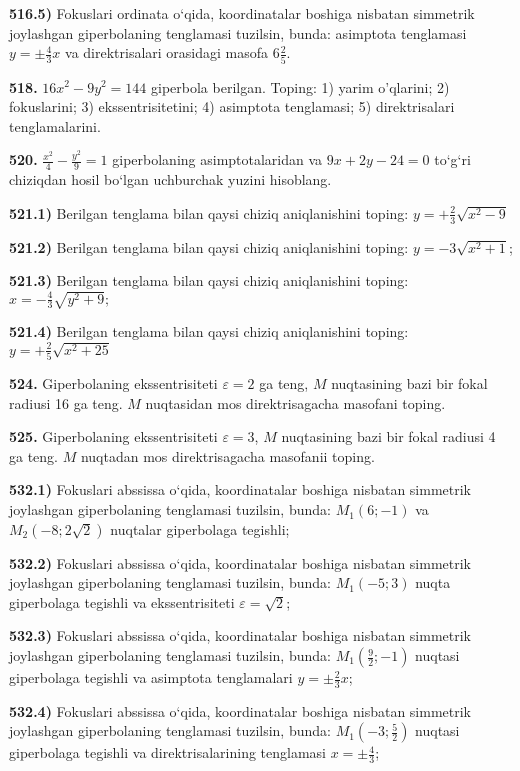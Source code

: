 \textbf{516.5)} Fokuslari ordinata o‘qida, koordinatalar boshiga nisbatan simmetrik joylashgan giperbolaning tenglamasi tuzilsin, bunda: asimptota tenglamasi $y= \pm \frac{4}{3} x$ va direktrisalari orasidagi masofa $6 \frac{2}{5}$.

\textbf{518.} $16 x^2-9 y^2=144$ giperbola berilgan. Toping: 1) yarim o'qlarini; 2) fokuslarini; 3) ekssentrisitetini; 4) asimptota tenglamasi; 5) direktrisalari tenglamalarini.

\textbf{520.} $\frac{x^2}{4}-\frac{y^2}{9}=1$ giperbolaning asimptotalaridan va $9 x+2 y-24=0$ to‘g‘ri chiziqdan hosil bo‘lgan uchburchak yuzini hisoblang.

\textbf{521.1)} Berilgan tenglama bilan qaysi chiziq aniqlanishini toping: $y=+\frac{2}{3} \sqrt{x^2-9}$

\textbf{521.2)} Berilgan tenglama bilan qaysi chiziq aniqlanishini toping: $y=-3 \sqrt{x^2+1}$;

\textbf{521.3)} Berilgan tenglama bilan qaysi chiziq aniqlanishini toping: $x=-\frac{4}{3} \sqrt{y^2+9} ;$

\textbf{521.4)} Berilgan tenglama bilan qaysi chiziq aniqlanishini toping: $y=+\frac{2}{5} \sqrt{x^2+25}$

\textbf{524.} Giperbolaning ekssentrisiteti $\varepsilon=2$ ga teng, $M$ nuqtasining bazi bir fokal radiusi 16 ga teng. $M$ nuqtasidan mos direktrisagacha masofani toping.

\textbf{525.} Giperbolaning ekssentrisiteti $\varepsilon=3$, $M$ nuqtasining bazi bir fokal radiusi 4 ga teng. $M$ nuqtadan mos direktrisagacha masofanii toping.

\textbf{532.1)} Fokuslari abssissa o‘qida, koordinatalar boshiga nisbatan simmetrik joylashgan giperbolaning tenglamasi tuzilsin, bunda: $M_1(6 ;-1)$ va $M_2(-8 ; 2 \sqrt{2})$ nuqtalar giperbolaga tegishli;

\textbf{532.2)} Fokuslari abssissa o‘qida, koordinatalar boshiga nisbatan simmetrik joylashgan giperbolaning tenglamasi tuzilsin, bunda: $M_1(-5 ; 3)$ nuqta giperbolaga tegishli va ekssentrisiteti $\varepsilon=\sqrt{2}$;

\textbf{532.3)} Fokuslari abssissa o‘qida, koordinatalar boshiga nisbatan simmetrik joylashgan giperbolaning tenglamasi tuzilsin, bunda: $M_1\left(\frac{9}{2} ;-1\right)$ nuqtasi giperbolaga tegishli va asimptota tenglamalari $y= \pm \frac{2}{3} x$;

\textbf{532.4)} Fokuslari abssissa o‘qida, koordinatalar boshiga nisbatan simmetrik joylashgan giperbolaning tenglamasi tuzilsin, bunda: $M_1\left(-3 ; \frac{5}{2}\right)$ nuqtasi giperbolaga tegishli va direktrisalarining tenglamasi $x= \pm \frac{4}{3}$;

